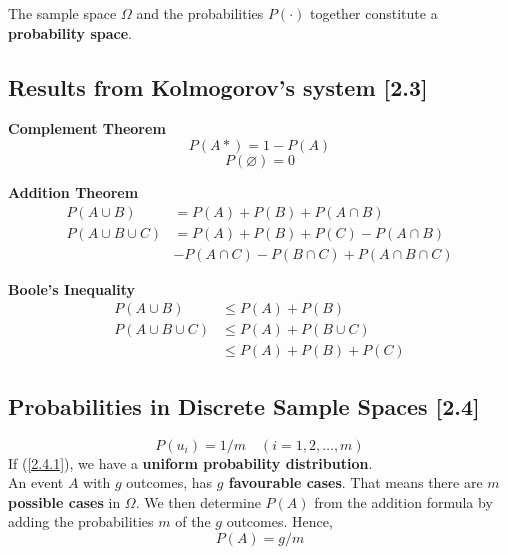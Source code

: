 \documentclass[a4paper,9pt]{extarticle}
\begin{document}
\begin{multicols*}{2}
The sample space $\Omega$ and the probabilities $P(\cdot)$ together constitute a \textbf{probability space}.

\subsection{Results from Kolmogorov's system [2.3]}
\textbf{Complement Theorem}
\begin{equation}
    P(A*) = 1 - P(A)
\end{equation}
\begin{equation}
    P(\varnothing) = 0
\end{equation}

\noindent \textbf{Addition Theorem}
\begin{equation}
    \begin{split}
        P(A \cup B) & = P(A) + P(B) + P(A \cap B) \\
        P(A \cup B \cup C) & = P(A) + P(B) + P(C) - P(A \cap B) \\
        & - P(A \cap C) - P(B \cap C) + P(A \cap B \cap C)
    \end{split}
\end{equation}

\noindent \textbf{Boole's Inequality}
\begin{equation}
    \begin{split}
        P(A \cup B) & \leq P(A) + P(B) \\
        P(A \cup B \cup C) & \leq P(A) + P(B \cup C) \\
        & \leq P(A) + P(B) + P(C)
    \end{split}
\end{equation}

\subsection{Probabilities in Discrete Sample Spaces [2.4]}
\begin{equation} \label{2.4.1}
    P(u_i) = 1/m \quad (i = 1, 2, \ldots, m)
\end{equation}
If (\ref{2.4.1}), we have a \textbf{uniform probability distribution}. \\

An event $A$ with $g$ outcomes, has \textbf{$g$ favourable cases}. That means there are \textbf{$m$ possible cases} in $\Omega$. We then determine $P(A)$ from the addition formula by adding the probabilities $m$ of the $g$ outcomes. Hence,
\begin{equation}
    P(A) = g/m
\end{equation}


\end{multicols*}
\end{document}
